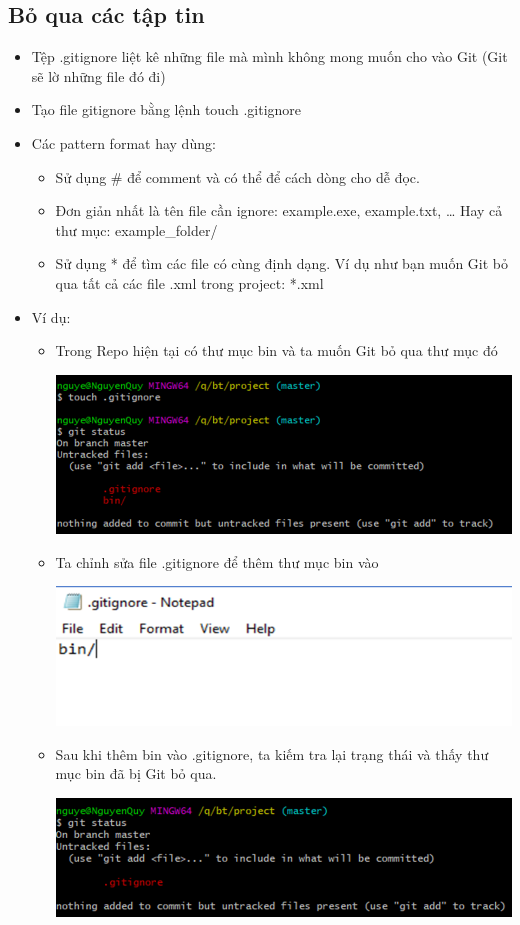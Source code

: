 \documentclass[12pt,a4paper]{report}
\begin{document}
\subsection{Bỏ qua các tập tin}
\begin{itemize}
\item Tệp .gitignore liệt kê những file mà mình không mong muốn cho vào Git (Git sẽ lờ những file đó đi)
\item Tạo file gitignore bằng lệnh touch .gitignore
\item Các pattern format hay dùng:
	\begin{itemize}
	\item Sử dụng \# để comment và có thể để cách dòng cho dễ đọc. 
	\item Đơn giản nhất là tên file cần ignore: example.exe, example.txt, …
	Hay cả thư mục: example\_folder/
	\item Sử dụng * để tìm các file có cùng định dạng. Ví dụ như bạn muốn Git bỏ qua tất cả các file .xml trong project: *.xml
	\end{itemize}
\item Ví dụ: 
\begin{itemize}
\item Trong Repo hiện tại có thư mục bin và ta muốn Git bỏ qua thư mục đó

	\includegraphics[width=0.8\linewidth]{screenshot009}

	\label{fig:screenshot009}

\item Ta chỉnh sửa file .gitignore để thêm thư mục bin vào

	\includegraphics[width=0.8\linewidth]{screenshot010}
	
	\label{fig:screenshot010}

\item Sau khi thêm bin vào .gitignore, ta kiếm tra lại trạng thái và thấy thư mục bin đã bị Git bỏ qua.

	\includegraphics[width=0.8\linewidth]{screenshot011}

	\label{fig:screenshot011}
\end{itemize}
\end{itemize}
\end{document}
